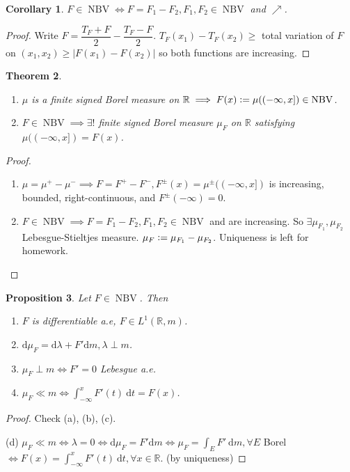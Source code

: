 \documentclass{report}
\newcommand{\R}{\mathbb{R}}
\def \NBV {\operatorname{NBV}}
\newcommand{\df}{\ \mathrm{d}}
\newcommand{\ndf}{\mathrm{d}}
\newcommand{\defeq}{\vcentcolon=}
\newtheorem{theorem}{Theorem}[chapter]
\newtheorem{corollary}[theorem]{Corollary}
\newtheorem{proposition}[theorem]{Proposition}
\theoremstyle{definition}
\theoremstyle{remark}
\newcommand{\fnl}{\parbox[t]{0\linewidth}{}}
\begin{document}
\begin{corollary}
	$F \in \operatorname{NBV} \iff F = F_1 - F_2, F_1, F_2 \in \operatorname{NBV}$ and $\nearrow$.
\end{corollary}
\begin{proof}
	Write $F = \dfrac{T_F + F}{2} - \dfrac{T_F - F}{2}$. $T_F(x_1) - T_F(x_2) \geq $ total variation of $F$ on $(x_1, x_2) \geq |F(x_1) - F(x_2)|$ so both functions are increasing.
\end{proof}

\begin{theorem}\fnl
	\begin{enumerate}
		\item $\mu$ is a finite \emph{signed} Borel measure on $\R \implies F(x) \defeq \mu((-\infty, x]) \in \operatorname{NBV}$.
		\item $F \in \NBV \implies \exists!$ finite \emph{signed} Borel measure $\mu_F$ on $\R$ satisfying $\mu((-\infty, x]) = F(x)$.
	\end{enumerate}
\end{theorem}

\begin{proof}
	\begin{enumerate}
		\item $\mu = \mu^+ - \mu^- \implies F = F^+ - F^-, F^\pm (x) = \mu^\pm ((-\infty, x])$ is increasing, bounded, right-continuous, and $F^\pm (-\infty) = 0$. 
		\item $F \in \NBV \implies F = F_1 - F_2, F_1, F_2 \in \NBV$ and are increasing. So $\exists \mu_{F_1}, \mu_{F_2}$ Lebesgue-Stieltjes measure. $\mu_F \defeq \mu_{F_1} - \mu_{F_2}$. Uniqueness is left for homework.
	\end{enumerate}
\end{proof}

\begin{proposition}
	Let $F \in \NBV$. Then \begin{enumerate}
		\item $F$ is differentiable a.e, $F \in L^1(\R, m)$.
		\item $\ndf \mu_{F} = \ndf \lambda + F' \ndf m, \lambda \perp m$.
		\item $\mu_F \perp m \iff F' = 0$ Lebesgue a.e.
		\item $\mu_F \ll m \iff \displaystyle \int_{-\infty}^x F'(t)\df t = F(x)$.
	\end{enumerate}
\end{proposition}
\begin{proof}
	Check (a), (b), (c).

	(d) $\mu_F \ll m \iff \lambda = 0 \iff \ndf \mu_F = F' \ndf m \iff \mu_F = \int_E F' \df m, \forall E$ Borel $\iff F(x) = \int_{-\infty}^x F'(t)\df t, \forall x \in \R$. (by uniqueness)
\end{proof}
\end{document}
